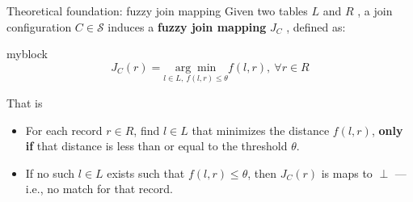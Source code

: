 \documentclass[8pt]{beamer} %
\begin{document}
\begin{frame}{Theoretical foundation: fuzzy join mapping}
	Given two tables $L$  and $R$ , a join configuration $C \in \mathcal{S}$ induces a \textbf{fuzzy join mapping} $J_C$ , defined as:
	
	\begin{beamercolorbox}[rounded=true, shadow=true, leftskip=1em, rightskip=1em]{myblock}
	$$
		J_C(r) = \underset{l \in L,\ f(l, r) \leq \theta}{\arg\min} f(l, r),\ \forall r \in R
	$$
	\end{beamercolorbox}
	
	That is
	\begin{itemize}
		\item For each record $r \in R$, find $l \in L$ that minimizes the distance $f(l, r)$, \textbf{only if} that distance is less than or equal to the threshold $\theta$.
		\item If no such $l \in L$ exists such that $f(l, r) \leq \theta$, then $J_C(r)$ is maps to $\perp$ — i.e., no match for that record.
	\end{itemize}

\end{frame}
\end{document}
